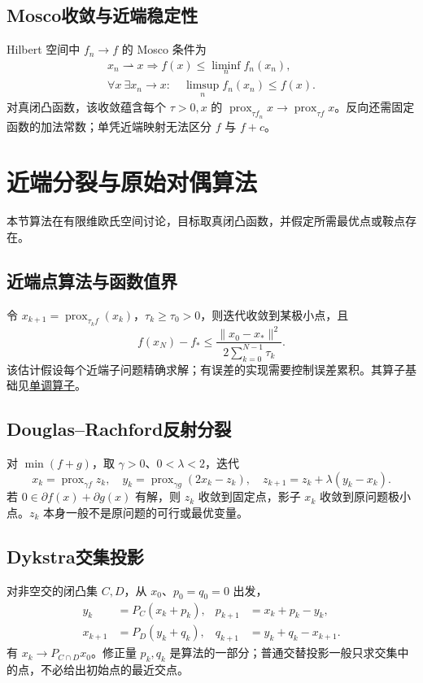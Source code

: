 \documentclass[../main.tex]{subfiles}
\begin{document}
\subsection{Mosco收敛与近端稳定性}
Hilbert 空间中 $f_n\to f$ 的 Mosco 条件为
\begin{gather*}
x_n\rightharpoonup x\Rightarrow f(x)\le\liminf_nf_n(x_n),\\
\forall x\ \exists x_n\to x:\quad\limsup_nf_n(x_n)\le f(x).
\end{gather*}
对真闭凸函数，该收敛蕴含每个 $\tau>0,x$ 的 $\operatorname{prox}_{\tau f_n}x\to\operatorname{prox}_{\tau f}x$。反向还需固定函数的加法常数；单凭近端映射无法区分 $f$ 与 $f+c$。
\section{近端分裂与原始对偶算法}
本节算法在有限维欧氏空间讨论，目标取真闭凸函数，并假定所需最优点或鞍点存在。
\subsection{近端点算法与函数值界}
令 $x_{k+1}=\operatorname{prox}_{\tau_k f}(x_k)$，$\tau_k\ge\tau_0>0$，则迭代收敛到某极小点，且
\[
f(x_N)-f_*\le\frac{\|x_0-x_*\|^2}{2\sum_{k=0}^{N-1}\tau_k}.
\]
该估计假设每个近端子问题精确求解；有误差的实现需要控制误差累积。其算子基础见\hyperref[sec:fa-monotone]{单调算子}。
\subsection{Douglas--Rachford反射分裂}
对 $\min(f+g)$，取 $\gamma>0$、$0<\lambda<2$，迭代
\[
x_k=\operatorname{prox}_{\gamma f}z_k,\quad
y_k=\operatorname{prox}_{\gamma g}(2x_k-z_k),\quad
z_{k+1}=z_k+\lambda(y_k-x_k).
\]
若 $0\in\partial f(x)+\partial g(x)$ 有解，则 $z_k$ 收敛到固定点，影子 $x_k$ 收敛到原问题极小点。$z_k$ 本身一般不是原问题的可行或最优变量。
\subsection{Dykstra交集投影}
对非空交的闭凸集 $C,D$，从 $x_0$、$p_0=q_0=0$ 出发，
\begin{align*}
y_k&=P_C(x_k+p_k),&p_{k+1}&=x_k+p_k-y_k,\\
x_{k+1}&=P_D(y_k+q_k),&q_{k+1}&=y_k+q_k-x_{k+1}.
\end{align*}
有 $x_k\to P_{C\cap D}x_0$。修正量 $p_k,q_k$ 是算法的一部分；普通交替投影一般只求交集中的点，不必给出初始点的最近交点。
\end{document}
